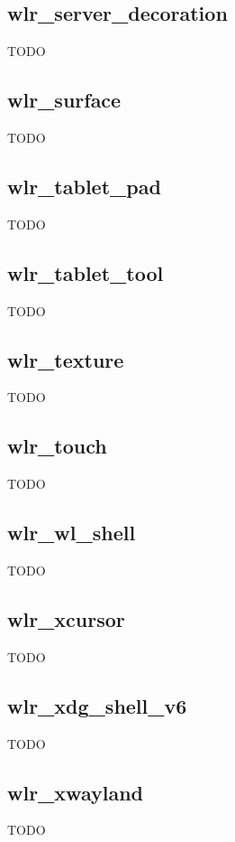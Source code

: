 \documentclass{article}
\begin{document}
\subsection{wlr_server_decoration}\label{wlr server decoration}

TODO

\subsection{wlr_surface}\label{wlr surface}

TODO

\subsection{wlr_tablet_pad}\label{wlr tablet pad}

TODO

\subsection{wlr_tablet_tool}\label{wlr tablet tool}

TODO

\subsection{wlr_texture}\label{wlr texture}

TODO

\subsection{wlr_touch}\label{wlr touch}

TODO

\subsection{wlr_wl_shell}\label{wlr wl shell}

TODO

\subsection{wlr_xcursor}\label{wlr xcursor}

TODO

\subsection{wlr_xdg_shell_v6}\label{wlr xdg shell v6}

TODO

\subsection{wlr_xwayland}\label{wlr xwayland}

TODO
\end{document}
